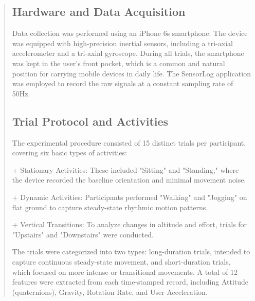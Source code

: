\documentclass[11pt,a4paper]{article}
\begin{document}
\begin{quote}
\subsection{Hardware and Data Acquisition}
Data collection was performed using an iPhone 6s smartphone. The device was equipped with high-precision inertial sensors, including a tri-axial accelerometer and a tri-axial gyroscope. During all trials, the smartphone was kept in the user's front pocket, which is a common and natural position for carrying mobile devices in daily life. The SensorLog application was employed to record the raw signals at a constant sampling rate of 50Hz.

\subsection{Trial Protocol and Activities}

The experimental procedure consisted of 15 distinct trials per participant, covering six basic types of activities:
 
 + Stationary Activities: These included "Sitting" and "Standing," where the device recorded the baseline orientation and minimal movement noise.

+ Dynamic Activities: Participants performed "Walking" and "Jogging" on flat ground to capture steady-state rhythmic motion patterns.

+ Vertical Transitions: To analyze changes in altitude and effort, trials for "Upstairs" and "Downstairs" were conducted.

The trials were categorized into two types: long-duration trials, intended to capture continuous steady-state movement, and short-duration trials, which focused on more intense or transitional movements. A total of 12 features were extracted from each time-stamped record, including Attitude (quaternions), Gravity, Rotation Rate, and User Acceleration.
\end{quote}
\end{document}
